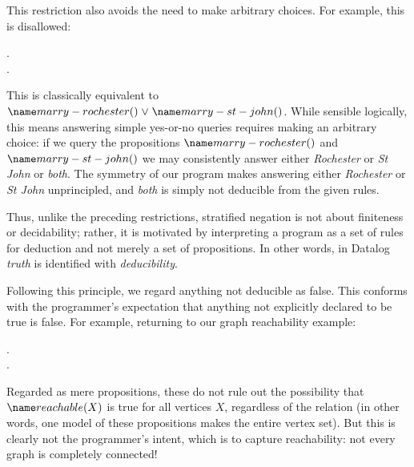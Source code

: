 This restriction also avoids the need to make arbitrary choices. For example,
this is disallowed:

\begin{datalog}
   \gets \neg {}.\\
   \gets \neg {}.
\end{datalog}

\noindent
This is classically equivalent to $\atom{marry-rochester}{} \vee
\atom{marry-st-john}{}$. While sensible logically, this means answering simple
yes-or-no queries requires making an arbitrary choice: if we query the
propositions $\atom{marry-rochester}{}$ and $\atom{marry-st-john}{}$ we
may consistently answer either \emph{Rochester} or \emph{St John} or
\emph{both}.
%
The symmetry of our program makes answering either
\emph{Rochester} or \emph{St John} unprincipled, and \emph{both} is simply
not deducible from the given rules.%
%

Thus, unlike the preceding restrictions, stratified negation is not about
finiteness or decidability; rather, it is motivated by interpreting a program
as a set of rules for deduction and not merely a set of propositions. In other
words, in Datalog \emph{truth} is identified with \emph{deducibility}.

Following this principle, we regard anything not deducible as false. This
conforms with the programmer's expectation that anything not explicitly declared
to be true is false. For example, returning to our graph reachability example:

\begin{datalog}
   \gets {} \conj {}.\\
  .
\end{datalog}


\noindent
Regarded as mere propositions, these do not rule out the possibility that
$\atom{reachable}{X}$ is true for all vertices $X$, regardless of the
 relation (in other words, one model of these propositions makes
 the entire vertex set). But this is clearly not the
programmer's intent, which is to capture reachability: not every graph is
completely connected!

